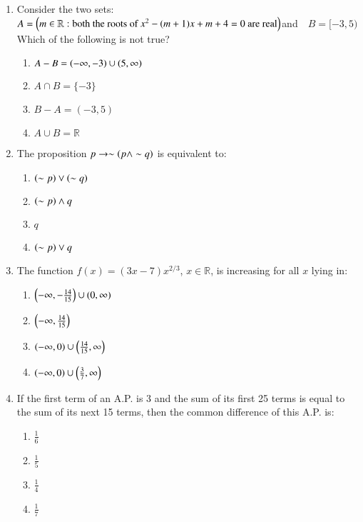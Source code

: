 \documentclass[journal,12pt,onecolumn]{IEEEtran}
\theoremstyle{remark}
\begin{document}
\begin{enumerate}
    \item Consider the two sets:\\
    $ A = \left( m \in \mathbb{R} : \text{both the roots of } x^2 - (m+1)x + m + 4 = 0 \text{ are real} \right)$and$\quad B = [-3, 5) $\\
    Which of the following is not true?
    \begin{enumerate}
        \item $ A - B = \left(-\infty, -3\right) \cup \left(5, \infty\right) $
        \item $ A \cap B = \{-3\} $
        \item $ B - A = (-3, 5) $
        \item $ A \cup B = \mathbb{R} $
    \end{enumerate}

    \item The proposition $ p \to \sim\left(p \land \sim q\right) $ is equivalent to:
    \begin{enumerate}
        \item $ \left(\sim p\right) \lor \left(\sim q\right) $
        \item $ \left(\sim p\right) \land q $
        \item $ q $
        \item $ \left(\sim p\right) \lor q $
    \end{enumerate}

    \item The function $ f(x) = (3x - 7)x^{2/3} $, $ x \in \mathbb{R} $, is increasing for all $ x $ lying in:
    \begin{enumerate}
        \item $ \left( -\infty, -\frac{14}{15} \right) \cup (0, \infty) $
        \item $ \left( -\infty, \frac{14}{15} \right) $
        \item $ \left( -\infty, 0 \right) \cup \left( \frac{14}{15}, \infty \right) $
        \item $ \left( -\infty, 0\right) \cup \left( \frac{3}{7}, \infty \right) $
    \end{enumerate}

    \item If the first term of an A.P. is 3 and the sum of its first 25 terms is equal to the sum of its next 15 terms, then the common difference of this A.P. is:
    \begin{enumerate}
        \item $ \frac{1}{6} $
        \item $ \frac{1}{5} $
        \item $ \frac{1}{4} $
        \item $ \frac{1}{7} $
    \end{enumerate}
\end{enumerate}
\end{document}
